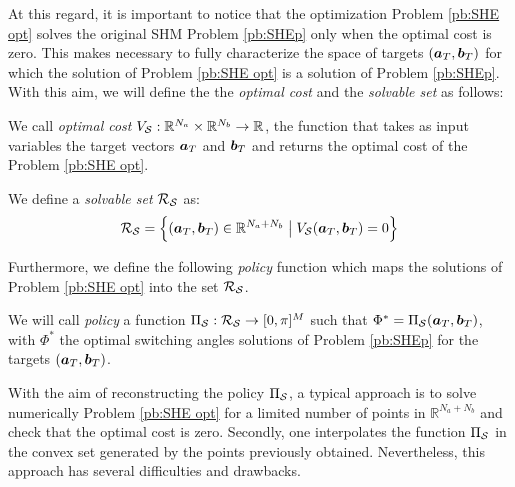\documentclass[9pt,shortpaper,twoside,web]{ieeecolor}
\begin{document}
At this regard, it is important to notice that the optimization Problem \ref{pb:SHE opt} solves the original SHM Problem \ref{pb:SHEp} only when the optimal cost is zero. This makes necessary to fully characterize the space of targets $(\bm{a}_T,\bm{b}_T)$ for which the solution of Problem \ref{pb:SHE opt} is a solution of Problem \ref{pb:SHEp}. With this aim, we will define the the \textit{optimal cost} and the \textit{solvable set} as follows:
\begin{definition}
We call \emph{optimal cost} $V_{\mathcal{S}}:\mathbb{R}^{N_a}\times \mathbb{R}^{N_b} \rightarrow \mathbb{R}$, the function that takes as input variables the target vectors $\bm{a}_T$ and $\bm{b}_T$ and returns the optimal cost of the Problem \ref{pb:SHE opt}.
\end{definition}

\begin{definition}
	We define a \emph{solvable set} $\mathcal{R}_{\mathcal{S}}$ as:
	\begin{gather}
		\mathcal{R}_{\mathcal{S}} = \Big\{ (\bm{a}_T,\bm{b}_T) \in \mathbb{R}^{N_a+N_b}\;\big|\; V_{\mathcal{S}}(\bm{a}_T,\bm{b}_T) = 0\Big\}
	\end{gather}
\end{definition}

Furthermore, we define the following \textit{policy} function which maps the solutions of Problem \ref{pb:SHE opt} into the set $\mathcal{R}_{\mathcal{S}}$.

\begin{definition}[Policy]\label{def:policy}
We will call \emph{policy} a function $\Pi_{\mathcal{S}}: \mathcal{R}_{\mathcal{S}} \rightarrow [0,\pi]^M$ such that $\Phi^* = \Pi_{\mathcal{S}}(\bm{a}_T,\bm{b}_T)$, with $\Phi^*$ the optimal switching angles solutions of Problem \ref{pb:SHEp} for the targets $(\bm{a}_T,\bm{b}_T)$.
\end{definition} 

With the aim of reconstructing the policy $\Pi_{\mathcal{S}}$, a typical approach is to solve numerically Problem \ref{pb:SHE opt} for a limited number of points in $\mathbb{R}^{N_a+N_b}$ and check that the optimal cost is zero. Secondly, one interpolates the function $\Pi_{\mathcal{S}}$ in the convex set generated by the points previously obtained. Nevertheless, this approach has several difficulties and drawbacks.
\end{document}
